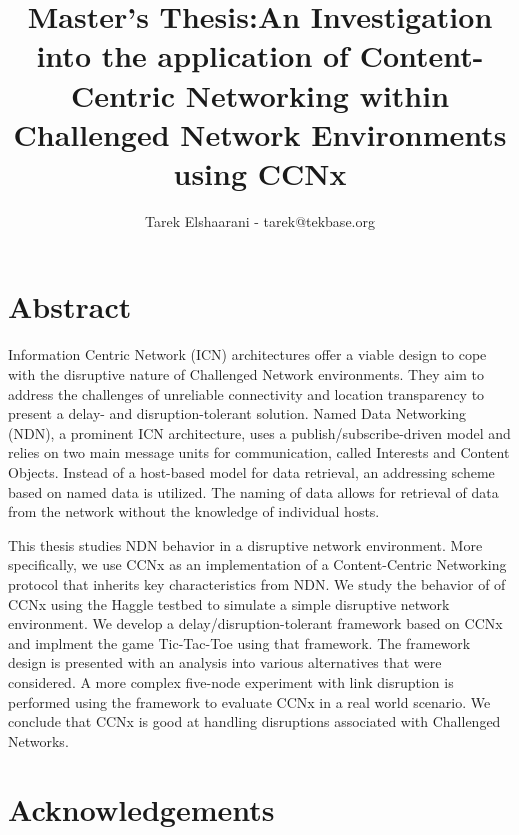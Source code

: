 \documentclass[a4paper,12pt]{report}      %
\title{Master's Thesis:\endgraf An Investigation into the application of Content-Centric Networking within Challenged Network Environments using CCNx}
\author{Tarek Elshaarani - tarek@tekbase.org }
\date{\parbox{\linewidth}{\centering
  \bigskip
  \today\endgraf
  \vspace*{7cm}
  Supervisors: \endgraf
  \hspace*{1cm} Frederik Hermans   - frederik.hermans@it.uu.se \endgraf
  \hspace*{1cm} Ferdrik Bjurefors  - fredrik.bjurefors@it.uu.se \endgraf
  \bigskip
  Reviewer: \endgraf
  \hspace*{1cm} Christian Rohner   - christian.rohner@it.uu.se \endgraf
  \bigskip\bigskip
  Department of Information Technology\endgraf
  Uppsala Universitet}}
\begin{document}
\maketitle



\pagebreak
\chapter*{Abstract}

Information Centric Network (ICN) architectures offer a viable design to cope with the disruptive nature of Challenged Network environments. They aim to address the challenges of unreliable connectivity and location transparency to present a delay- and disruption-tolerant solution. Named Data Networking (NDN), a prominent ICN architecture, uses a publish/subscribe-driven model and relies on two main message units for communication, called Interests and Content Objects. Instead of a host-based model for data retrieval, an addressing scheme based on named data is utilized. The naming of data allows for retrieval of data from the network without the knowledge of individual hosts. 

This thesis studies NDN behavior in a disruptive network environment. More specifically, we use CCNx as an implementation of a Content-Centric Networking protocol that inherits key characteristics from NDN. We study the behavior of of CCNx using the Haggle testbed to simulate a simple disruptive network environment. We develop a delay/disruption-tolerant framework based on CCNx and implment the game Tic-Tac-Toe using that framework. The framework design is presented with an analysis into various alternatives that were considered. A more complex five-node experiment with link disruption is performed using the framework to evaluate CCNx in a real world scenario. We conclude that CCNx is good at handling disruptions associated with Challenged Networks.




\pagebreak
\chapter*{Acknowledgements}
\end{document}
